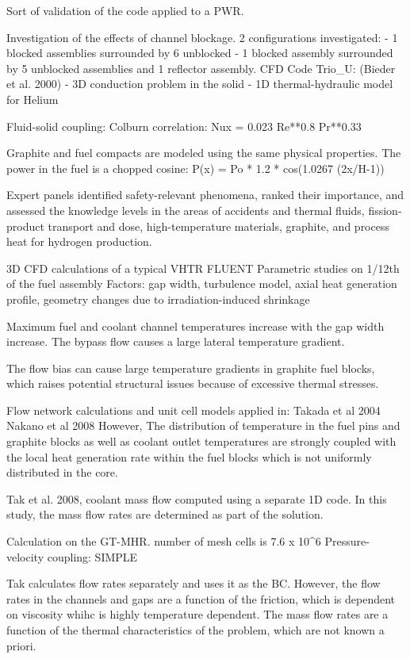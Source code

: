 Sort of validation of the code applied to a PWR.

Investigation of the effects of channel blockage.
2 configurations investigated:
- 1 blocked assemblies surrounded by 6 unblocked
- 1 blocked assembly surrounded by 5 unblocked assemblies and 1 reflector assembly.
CFD Code Trio_U: (Bieder et al. 2000)
- 3D conduction problem in the solid
- 1D thermal-hydraulic model for Helium

Fluid-solid coupling:
Colburn correlation: Nux = 0.023 Re**0.8 Pr**0.33

Graphite and fuel compacts are modeled using the same physical properties.
The power in the fuel is a chopped cosine:
P(x) = Po * 1.2 * cos(1.0267 (2x/H-1))

Expert panels identified safety-relevant phenomena, ranked their importance, and assessed
the knowledge levels in the areas of accidents and thermal fluids, fission-product transport and dose,
high-temperature materials, graphite, and process heat for hydrogen production.


3D CFD calculations of a typical VHTR
FLUENT
Parametric studies on 1/12th of the fuel assembly
Factors: gap width, turbulence model, axial heat generation profile, geometry changes due to irradiation-induced shrinkage

Maximum fuel and coolant channel temperatures increase with the gap width increase.
The bypass flow causes a large lateral temperature gradient.

The flow bias can cause large temperature gradients in graphite fuel blocks, which raises potential structural issues because of excessive thermal stresses.

Flow network calculations and unit cell models applied in:
Takada et al 2004
Nakano et al 2008
However,
The distribution of temperature in the fuel pins and graphite blocks as well as coolant outlet temperatures are strongly coupled with the local heat generation rate within the fuel blocks which is not uniformly distributed in the core.

Tak et al. 2008, coolant mass flow computed using a separate 1D code.
In this study, the mass flow rates are determined as part of the solution.

Calculation on the GT-MHR.
number of mesh cells is 7.6 x 10^6
Pressure-velocity coupling: SIMPLE

Tak calculates flow rates separately and uses it as the BC.
However, the flow rates in the channels and gaps are a function of the friction, which is dependent on viscosity whihc is highly temperature dependent.
The mass flow rates are a function of the thermal characteristics of the problem, which are not known a priori.

